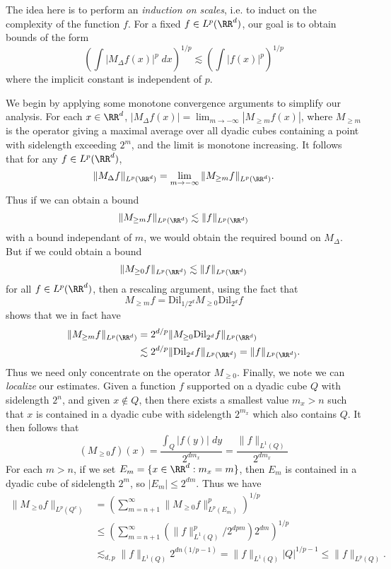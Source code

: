 The idea here is to perform an \emph{induction on scales}, i.e. to induct on the complexity of the function $f$. For a fixed $f \in L^p(\RR^d)$, our goal is to obtain bounds of the form
%
\[ \left( \int |M_\Delta f(x)|^p\; dx \right)^{1/p} \lesssim \left( \int |f(x)|^p \right)^{1/p} \]
%
where the implicit constant is independent of $p$.

We begin by applying some monotone convergence arguments to simplify our analysis. For each $x \in \RR^d$, $|M_\Delta f(x)| = \lim_{m \to -\infty} |M_{\geq m} f(x)|$, where $M_{\geq m}$ is the operator giving a maximal average over all dyadic cubes containing a point with sidelength exceeding $2^m$, and the limit is monotone increasing. It follows that for any $f \in L^p(\RR^d)$,
%
\[ \| M_\Delta f \|_{L^p(\RR^d)} = \lim_{m \to -\infty} \| M_{\geq m} f \|_{L^p(\RR^d)}. \]
%
Thus if we can obtain a bound
%
\[ \| M_{\geq m} f \|_{L^p(\RR^d)} \lesssim \| f \|_{L^p(\RR^d)} \]
%
with a bound independant of $m$, we would obtain the required bound on $M_\Delta$. But if we could obtain a bound
%
\[ \| M_{\geq 0} f \|_{L^p(\RR^d)} \lesssim \| f \|_{L^p(\RR^d)} \]
%
for all $f \in L^p(\RR^d)$, then a rescaling argument, using the fact that
%
\[ M_{\geq m} f = \text{Dil}_{1/2^d} M_{\geq 0} \text{Dil}_{2^d} f \]
%
shows that we in fact have
%
\begin{align*}
  \| M_{\geq m} f \|_{L^p(\RR^d)} &= 2^{d/p} \| M_{\geq 0} \text{Dil}_{2^d} f \|_{L^p(\RR^d)}\\
  &\lesssim 2^{d/p} \| \text{Dil}_{2^d} f \|_{L^p(\RR^d)} = \| f \|_{L^p(\RR^d)}.
\end{align*}
%
Thus we need only concentrate on the operator $M_{\geq 0}$. Finally, we note we can \emph{localize} our estimates. Given a function $f$ supported on a dyadic cube $Q$ with sidelength $2^n$, and given $x \not \in Q$, then there exists a smallest value $m_x > n$ such that $x$ is contained in a dyadic cube with sidelength $2^{m_x}$ which also contains $Q$. It then follows that
%
\[ (M_{\geq 0} f)(x) = \frac{\int_Q |f(y)|\; dy}{2^{dm_x}} = \frac{\| f \|_{L^1(Q)}}{2^{dm_x}} \]
%
For each $m > n$, if we set $E_m = \{ x \in \RR^d: m_x = m \}$, then $E_m$ is contained in a dyadic cube of sidelength $2^m$, so $|E_m| \leq 2^{dm}$. Thus we have
%
\begin{align*}
  \| M_{\geq 0} f \|_{L^p(Q^c)} &= \left( \sum_{m = n+1}^\infty \| M_{\geq 0} f \|_{L^p(E_m)}^p \right)^{1/p}\\
  &\leq \left( \sum_{m = n+1}^\infty \left( \| f \|_{L^1(Q)}^p / 2^{dpm} \right) 2^{dm} \right)^{1/p}\\
  &\lesssim_{d,p} \| f \|_{L^1(Q)} 2^{dn(1/p - 1)} = \| f \|_{L^1(Q)} |Q|^{1/p-1} \leq \| f \|_{L^p(Q)}.
\end{align*}
